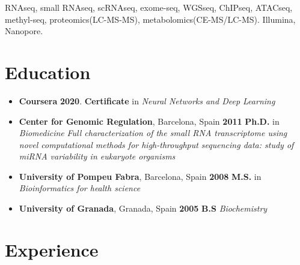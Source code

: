 RNAseq, small RNAseq, scRNAseq, exome-seq, WGSseq, ChIPseq, ATACseq, methyl-seq, proteomics(LC-MS-MS), metabolomics(CE-MS/LC-MS). Illumina, Nanopore.

\hypertarget{education}{%
\section{Education}\label{education}}

\begin{itemize}
\tightlist
\item \textbf{Coursera} \hfill \textbf{2020}.
  \newline
  \textbf{Certificate} in \textit{Neural Networks and Deep Learning}
\item
  \textbf{Center for Genomic Regulation}, Barcelona, Spain \hfill \textbf{2011}
  \newline
  \textbf{Ph.D.} in \textit{Biomedicine}
  \newline
  \textit{Full characterization of the small RNA transcriptome using novel computational methods for high-throughput
sequencing data: study of  miRNA variability in eukaryote organisms}
\item
  \textbf{University of Pompeu Fabra}, Barcelona, Spain \hfill \textbf{2008}
  \newline
  \textbf{M.S.} in \textit{Bioinformatics for health science}
\item
  \textbf{University of Granada}, Granada, Spain \hfill \textbf{2005}
  \newline
  \textbf{B.S} \textit{Biochemistry}
\end{itemize}

\hypertarget{experience}{%
\section{Experience}\label{experience}}

